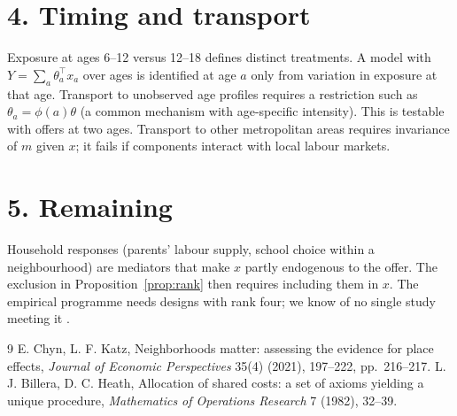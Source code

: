 \documentclass[11pt]{article}
\theoremstyle{definition}
\begin{document}
\section*{4. Timing and transport}
Exposure at ages 6--12 versus 12--18 defines distinct treatments. A model with $Y=\sum_a\theta_a^\top x_a$ over ages is
identified at age $a$ only from variation in exposure at that age. Transport to unobserved age profiles requires a
restriction such as $\theta_a=\phi(a)\theta$ (a common mechanism with age-specific intensity). This is testable with
offers at two ages. Transport to other metropolitan areas requires invariance of $m$ given $x$; it fails if components
interact with local labour markets.

\section*{5. Remaining}
Household responses (parents' labour supply, school choice within a neighbourhood) are mediators that make $x$ partly
endogenous to the offer. The exclusion in Proposition~\ref{prop:rank} then requires including them in $x$. The empirical
programme needs designs with rank four; we know of no single study meeting it \cite{ck}.

\begin{thebibliography}{9}
 E. Chyn, L. F. Katz, Neighborhoods matter: assessing the evidence for place effects, \emph{Journal of Economic Perspectives} 35(4) (2021), 197--222, pp.~216--217.
 L. J. Billera, D. C. Heath, Allocation of shared costs: a set of axioms yielding a unique procedure, \emph{Mathematics of Operations Research} 7 (1982), 32--39.
\end{thebibliography}
\end{document}
